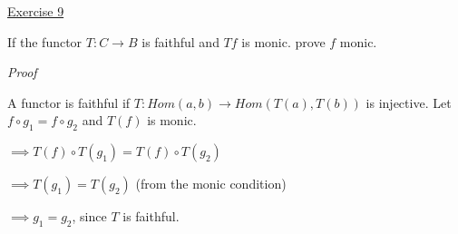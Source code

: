 \noindent
\underline{Exercise 9}
\vspace{2mm}

If the functor $T: C \to B$ is faithful and $Tf$ is monic. prove $f$ monic.

\vspace{2mm}

\noindent
\emph{Proof}

A functor is faithful if $T: Hom(a, b) \to Hom(T(a), T(b))$ is injective.
Let $f \circ g_1 = f \circ g_2$ and $T(f)$ is monic.

$\implies T(f) \circ T(g_1) = T(f) \circ T(g_2)$

$\implies T(g_1) = T(g_2)$ (from the monic condition)

$\implies g_1 = g_2$, since $T$ is faithful.


\vspace{2mm}
